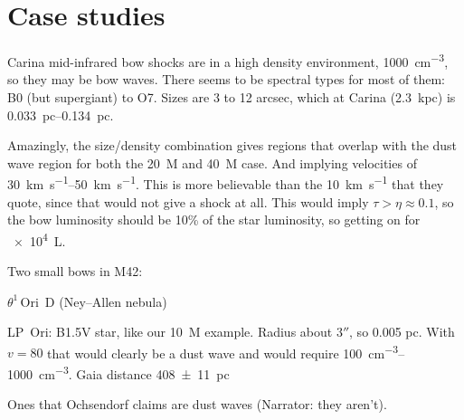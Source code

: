 \section{Case studies}
\label{sec:case-studies}

Carina mid-infrared bow shocks \citep{Sexton:2015b} are in a high
density environment, \SI{1000}{cm^{-3}}, so they may be bow waves.
There seems to be spectral types for most of them: B0 (but supergiant)
to O7.  Sizes are 3 to 12 arcsec, which at Carina (\SI{2.3}{kpc}) is
\SIrange{0.033}{0.134}{pc}.

Amazingly, the size/density combination gives regions that overlap
with the dust wave region for both the \SI{20}{M_\odot} and \SI{40}{M_\odot}
case.  And implying velocities of \SIrange{30}{50}{km.s^{-1}}.  This
is more believable than the \SI{10}{km.s^{-1}} that they quote, since
that would not give a shock at all.  This would imply
\(\tau > \eta \approx 0.1\), so the bow luminosity should be 10\% of the star
luminosity, so getting on for \SI{e4}{L_\odot}.

Two small bows in M42:

\(\theta^1\)\,Ori~D (Ney--Allen nebula) \citep{Robbertp:2005a}

LP~Ori: B1.5V star, like our \SI{10}{M_\odot} example. Radius about
\(3''\), so 0.005 pc.  With \(v = 80\) that would clearly be a dust
wave and would require \SIrange{100}{1000}{cm^{-3}}. Gaia distance \SI{408 +- 11}{pc}


Ones that Ochsendorf claims are dust waves (Narrator: they aren't).


